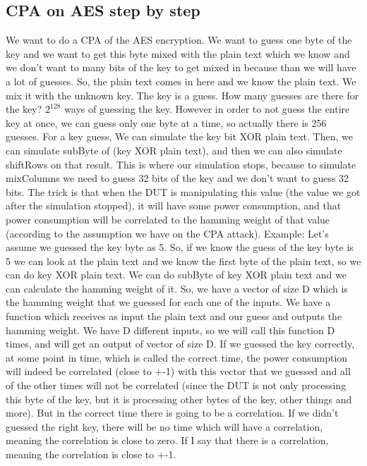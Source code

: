 \subsection{CPA on AES step by step}\label{c8_CPA_overview:subsec}
We want to do a CPA of the AES encryption. We want to guess one byte of the key and we want to get this byte mixed with the plain text which we know and we don’t want to many bits of the key to get mixed in because than we will have a lot of guesses. So, the plain text comes in here and we know the plain text. We mix it with the unknown key. The key is a guess. How many guesses are there for the key?  $2^{128}$ ways of guessing the key. However in order to not guess the entire key at once, we can guess only one byte at a time, so actually there is 256 guesses. 
For a key guess, We can simulate the key bit XOR plain text. Then, we can simulate subByte of (key XOR plain text), and then we can also simulate shiftRows on that result. This is where our simulation stops, because to simulate mixColumns we need to guess 32 bits of the key and we don’t want to guess 32 bits. 
The trick is that when the DUT is manipulating this value (the value we got after the simulation stopped), it will have some power consumption, and that power consumption will be correlated to the hamming weight of that value (according to the assumption we have on the CPA attack). 
Example: Let’s assume we guessed the key byte as 5. So, if we know the guess of the key byte is 5 we can look at the plain text and we know the first byte of the plain text, so we can do key XOR plain text. We can do subByte of key XOR plain text and we can calculate the hamming weight of it. So, we have a vector of size D which is the hamming weight that we guessed for each one of the inputs. We have a function which receives as input the plain text and our guess and outputs the hamming weight. We have D different inputs, so we will call this function D times, and will get an output of vector of size D. 
If we guessed the key correctly, at some point in time, which is called the correct time, the power consumption will indeed be correlated (close to +-1) with this vector that we guessed and all of the other times will not be correlated (since the DUT is not only processing this byte of the key, but it is processing other bytes of the key, other things and more). But in the correct time there is going to be a correlation. If we didn't guessed the right key, there will be no time which will have a correlation, meaning the correlation is close to zero. If I say that there is a correlation, meaning the correlation is close to +-1. 

